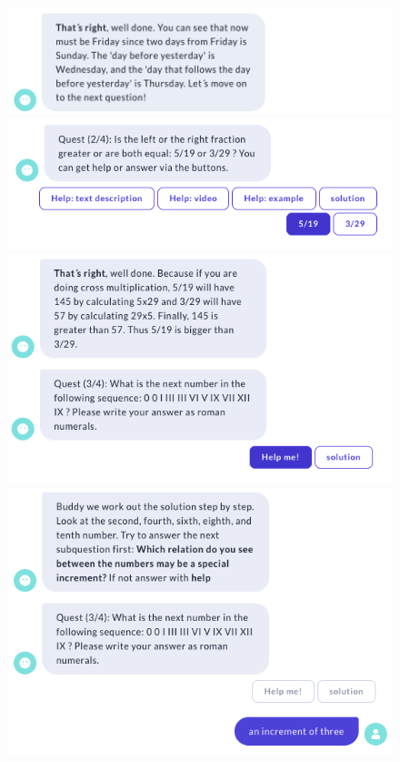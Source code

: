 \begin{figure}[H]
  \centering
  \includegraphics[width=0.7\linewidth]{images/Game/q1.2.png}
  \includegraphics[width=0.7\linewidth]{images/VickyQuiz/Q1.png}
  \includegraphics[width=0.7\linewidth]{images/VickyQuiz/Q2.png}
  \includegraphics[width=0.7\linewidth]{images/Game/Q3.33.png}

  \label{fig:Game_II}
\end{figure} 
